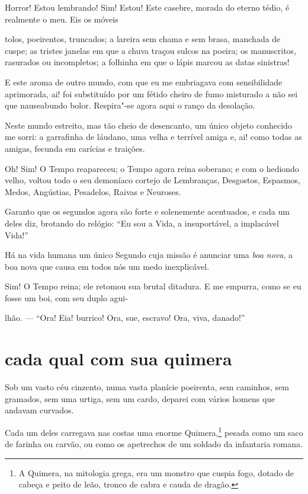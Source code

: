 Horror! Estou lembrando! Sim! Estou! Este casebre, morada do eterno
tédio, é realmente o meu. Eis os móveis

\noindent{}tolos, poeirentos, truncados; a
lareira sem chama e sem brasa, manchada de cuspe; as tristes janelas em
que a chuva traçou sulcos na poeira; os manuscritos, rasurados ou
incompletos; a folhinha em que o lápis marcou as datas sinistras!

E este aroma de outro mundo, com que eu me embriagava com
sensibilidade aprimorada, ai! foi substituído por um fétido cheiro
de fumo misturado a não sei que nauseabundo bolor. Respira"-se agora
aqui o ranço da desolação.

Neste mundo estreito, mas tão cheio de desencanto, um único objeto conhecido
me sorri: a garrafinha de láudano, uma velha e terrível amiga e, ai!
como todas as amigas, fecunda em carícias e traições.

Oh! Sim! O Tempo reapareceu; o Tempo agora reina soberano; e com o
hediondo velho, voltou todo o seu demoníaco cortejo de Lembranças,
Desgostos, Espasmos, Medos, Angústias, Pesadelos, Raivas e Neuroses.

Garanto que os segundos agora são forte e solenemente acentuados, e
cada um deles diz, brotando do relógio: ``Eu sou a Vida, a
insuportável, a implacável Vida!''

Há na vida humana um único Segundo cuja missão é anunciar uma \textit{boa
nova}, a boa nova que causa em todos nós um medo inexplicável.

Sim! O Tempo reina; ele retomou sua brutal ditadura. E me empurra, como
se eu fosse um boi, com seu duplo agui-

\quebra

\noindent{}lhão. --- ``Ora!
Eia! burrico! Ora, sue, escravo! Ora, viva, danado!''

\quebra\section[Cada qual com sua quimera]{cada qual com sua quimera}

Sob um vasto céu cinzento, numa vasta planície poeirenta, sem
caminhos, sem gramados, sem uma urtiga, sem um cardo, deparei com vários
homens que andavam curvados.

Cada um deles carregava nas costas uma enorme
Quimera,\protect\footnote{  A Quimera, na mitologia grega, era um monstro que cuspia fogo, dotado
de cabeça e peito de leão, tronco de cabra e cauda de dragão.} pesada como um saco de farinha ou
carvão, ou como os apetrechos de um soldado da infantaria romana.

